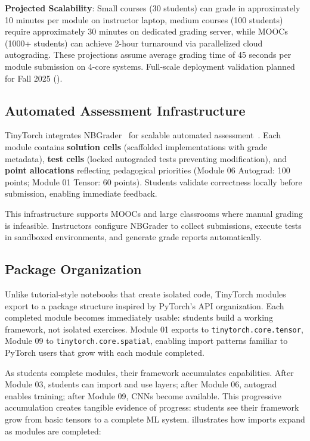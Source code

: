 \documentclass[10pt,twocolumn]{article}
\begin{document}
\textbf{Projected Scalability}: Small courses (30 students) can grade in approximately 10 minutes per module on instructor laptop, medium courses (100 students) require approximately 30 minutes on dedicated grading server, while MOOCs (1000+ students) can achieve 2-hour turnaround via parallelized cloud autograding. These projections assume average grading time of 45 seconds per module submission on 4-core systems. Full-scale deployment validation planned for Fall 2025 ().

\subsection{Automated Assessment Infrastructure}

TinyTorch integrates NBGrader~\citep{jupyter2019} for scalable automated assessment~\citep{thompson2008bloom}. Each module contains \textbf{solution cells} (scaffolded implementations with grade metadata), \textbf{test cells} (locked autograded tests preventing modification), and \textbf{point allocations} reflecting pedagogical priorities (Module 06 Autograd: 100 points; Module 01 Tensor: 60 points). Students validate correctness locally before submission, enabling immediate feedback.

This infrastructure supports MOOCs and large classrooms where manual grading is infeasible. Instructors configure NBGrader to collect submissions, execute tests in sandboxed environments, and generate grade reports automatically.

\subsection{Package Organization}
\label{subsec:package}

Unlike tutorial-style notebooks that create isolated code, TinyTorch modules export to a package structure inspired by PyTorch's API organization. Each completed module becomes immediately usable: students build a working framework, not isolated exercises. Module 01 exports to \texttt{tinytorch.core.tensor}, Module 09 to \texttt{tinytorch.core.spatial}, enabling import patterns familiar to PyTorch users that grow with each module completed.

As students complete modules, their framework accumulates capabilities. After Module 03, students can import and use layers; after Module 06, autograd enables training; after Module 09, CNNs become available. This progressive accumulation creates tangible evidence of progress: students see their framework grow from basic tensors to a complete ML system.  illustrates how imports expand as modules are completed:
\end{document}
